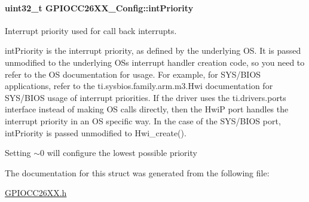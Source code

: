 \paragraph[{int\+Priority}]{\setlength{\rightskip}{0pt plus 5cm}uint32\+\_\+t G\+P\+I\+O\+C\+C26\+X\+X\+\_\+\+Config\+::int\+Priority}\label{struct_g_p_i_o_c_c26_x_x___config_a7f628362609f5d1cea2733083ddccedf}
Interrupt priority used for call back interrupts.

int\+Priority is the interrupt priority, as defined by the underlying O\+S. It is passed unmodified to the underlying O\+S\textquotesingle{}s interrupt handler creation code, so you need to refer to the O\+S documentation for usage. For example, for S\+Y\+S/\+B\+I\+O\+S applications, refer to the ti.\+sysbios.\+family.\+arm.\+m3.\+Hwi documentation for S\+Y\+S/\+B\+I\+O\+S usage of interrupt priorities. If the driver uses the ti.\+drivers.\+ports interface instead of making O\+S calls directly, then the Hwi\+P port handles the interrupt priority in an O\+S specific way. In the case of the S\+Y\+S/\+B\+I\+O\+S port, int\+Priority is passed unmodified to Hwi\+\_\+create().

Setting $\sim$0 will configure the lowest possible priority 

The documentation for this struct was generated from the following file\+:\begin{DoxyCompactItemize}
\item 
\hyperlink{_g_p_i_o_c_c26_x_x_8h}{G\+P\+I\+O\+C\+C26\+X\+X.\+h}\end{DoxyCompactItemize}
